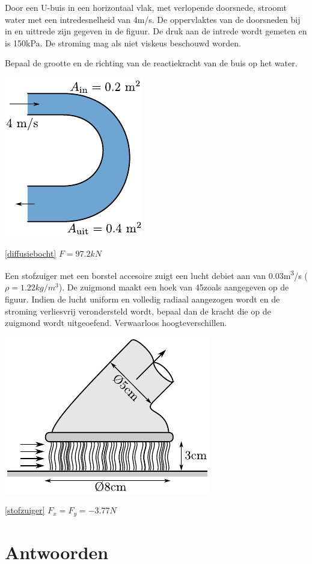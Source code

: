 \begin{toepassing}[*]
	\label{diffusiebocht}
Door een U-buis in een horizontaal vlak, met verlopende doorsnede, stroomt water met een intredesnelheid van 4m/s. De oppervlaktes van de doorsneden bij in en uittrede zijn gegeven in de figuur. De druk aan de intrede wordt gemeten en is 150\unit{kPa}. De stroming mag als niet viskeus beschouwd worden.
		
Bepaal de grootte en de richting van de reactiekracht van de buis op het water.

	\centering
	\includegraphics{fig/behoudsvergelijkingen/diffusiebocht}
\end{toepassing}
\begin{antwoord}{\ref{diffusiebocht}}
	$F = 97.2\unit{kN}$
\end{antwoord}
\begin{toepassing}[*]
	\label{stofzuiger}
Een stofzuiger met een borstel accesoire zuigt een lucht debiet aan van 0.03\unit{m^3/s} ($\rho=1.22\unit{kg/m^3}$). De zuigmond maakt een hoek van 45\deg zoals aangegeven op de figuur. Indien de lucht uniform en volledig radiaal aangezogen wordt en de stroming verliesvrij verondersteld wordt, bepaal dan de kracht die op de zuigmond wordt uitgeoefend. Verwaarloos hoogteverschillen.

	\centering
	\includegraphics{fig/behoudsvergelijkingen/stofzuiger}
\end{toepassing}
\begin{antwoord}{\ref{stofzuiger}}
	$F_x = F_y = -3.77\unit{N}$
\end{antwoord}	
\section*{Antwoorden}
	\begin{multicols}{2}
	\end{multicols}